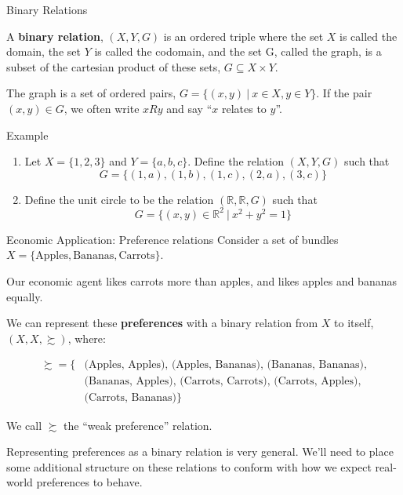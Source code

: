 \documentclass[11pt, xcolor={dvipsnames}, hyperref={colorlinks, allcolors=Blue}]{beamer}
\newcommand\bc[1]{{\usebeamercolor[fg]{frametitle} {\textbf{#1}}}} %
\newcommand{\R}{\mathbb{R}}
\begin{document}
\begin{frame}{Binary Relations}

A \bc{binary relation}, $(X, Y, G)$ is an ordered triple where the set $X$ is called the domain, the set $Y$ is called the codomain, and the set G, called the graph, is a subset of the cartesian product of these sets, $G \subseteq X\times Y$.
\bigskip

The graph is a set of ordered pairs, $G = \{(x,y) \ | \ x \in X, y \in Y\}$. If the pair $(x,y) \in G$, we often write $xRy$ and say ``$x$ relates to $y$''. 
\bigskip

\begin{block}{Example}
\begin{enumerate}
\item Let $X = \{1,2,3\}$ and $Y = \{a, b, c\}$. Define the relation $(X,Y,G)$ such that
\[G = \{(1,a), (1,b), (1,c), (2,a), (3, c)\}\]

\item Define the unit circle to be the relation $(\R, \R, G)$ such that
\[G = \{(x,y) \in \R^{2} \ | \ x^{2} + y^{2} = 1\}\]
\end{enumerate}
\end{block}


\end{frame}

\begin{frame}{Economic Application: Preference relations}
\label{slide:PreferenceRelation1}
Consider a set of bundles $X = \{\text{Apples}, \text{Bananas}, \text{Carrots}\}$. \\\bigskip

Our economic agent likes carrots more than apples, and likes apples and bananas equally.\\\bigskip

We can represent these \bc{preferences} with a binary relation from $X$ to itself, $(X, X, \succsim)$, where:

\begin{align*}
\succsim = \{&\text{(Apples, Apples), (Apples, Bananas),  (Bananas, Bananas),}\\
	        & \text{(Bananas, Apples), (Carrots, Carrots), (Carrots, Apples),}\\
		& \text{(Carrots, Bananas)}\}
\end{align*}

We call $\succsim$ the ``weak preference'' relation. \\ \bigskip

Representing preferences as a binary relation is very general. We'll need to place some additional structure on these relations to conform with how we expect real-world preferences to behave.


\end{frame}
\end{document}
